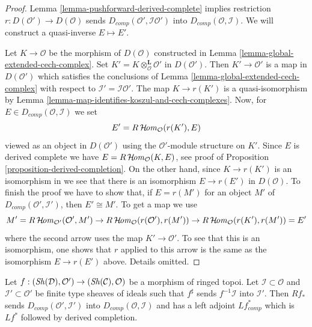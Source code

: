 \begin{proof}
Lemma \ref{lemma-pushforward-derived-complete} implies
restriction $r : D(\mathcal{O}') \to D(\mathcal{O})$
sends $D_{comp}(\mathcal{O}', \mathcal{I}\mathcal{O}')$
into $D_{comp}(\mathcal{O}, \mathcal{I})$. We will construct a
quasi-inverse $E \mapsto E'$.

\medskip\noindent
Let $K \to \mathcal{O}$ be the morphism of $D(\mathcal{O})$
constructed in Lemma \ref{lemma-global-extended-cech-complex}. 
Set $K' = K \otimes_\mathcal{O}^\mathbf{L} \mathcal{O}'$ in $D(\mathcal{O}')$.
Then $K' \to \mathcal{O}'$ is a map in $D(\mathcal{O}')$ which
satisfies the conclusions of Lemma \ref{lemma-global-extended-cech-complex}
with respect to $\mathcal{I}' = \mathcal{I}\mathcal{O}'$.
The map $K \to r(K')$ is a quasi-isomorphism by
Lemma \ref{lemma-map-identifies-koszul-and-cech-complexes}.
Now, for $E \in D_{comp}(\mathcal{O}, \mathcal{I})$ we set
$$
E' = R\mathop{\mathcal{H}\!\mathit{om}}\nolimits_\mathcal{O}(r(K'), E)
$$
viewed as an object in $D(\mathcal{O}')$ using the $\mathcal{O}'$-module
structure on $K'$. Since $E$ is derived complete
we have $E = R\mathop{\mathcal{H}\!\mathit{om}}\nolimits_\mathcal{O}(K, E)$, see
proof of Proposition \ref{proposition-derived-completion}.
On the other hand, since $K \to r(K')$ is an isomorphism in
we see that there is an isomorphism
$E \to r(E')$ in $D(\mathcal{O})$. To finish the proof we
have to show that, if $E = r(M')$ for an object $M'$ of
$D_{comp}(\mathcal{O}', \mathcal{I}')$, then
$E' \cong M'$. To get a map we use
$$
M' = R\mathop{\mathcal{H}\!\mathit{om}}\nolimits_{\mathcal{O}'}(\mathcal{O}', M') \to
R\mathop{\mathcal{H}\!\mathit{om}}\nolimits_\mathcal{O}(r(\mathcal{O}'), r(M')) \to
R\mathop{\mathcal{H}\!\mathit{om}}\nolimits_\mathcal{O}(r(K'), r(M')) = E'
$$
where the second arrow uses the map $K' \to \mathcal{O}'$.
To see that this is an isomorphism, one shows that $r$ applied
to this arrow is the same as the isomorphism $E \to r(E')$ above.
Details omitted.
\end{proof}

\begin{lemma}
\label{lemma-pushforward-derived-complete-adjoint}
Let $f : (\mathop{\mathit{Sh}}\nolimits(\mathcal{D}), \mathcal{O}') \to (\mathop{\mathit{Sh}}\nolimits(\mathcal{C}), \mathcal{O})$
be a morphism of ringed topoi. Let $\mathcal{I} \subset \mathcal{O}$
and $\mathcal{I}' \subset \mathcal{O}'$ 
be finite type sheaves of ideals such that $f^\sharp$ sends
$f^{-1}\mathcal{I}$ into $\mathcal{I}'$.
Then $Rf_*$ sends $D_{comp}(\mathcal{O}', \mathcal{I}')$
into $D_{comp}(\mathcal{O}, \mathcal{I})$ and has a left adjoint
$Lf_{comp}^*$ which is $Lf^*$ followed by derived completion.
\end{lemma}

